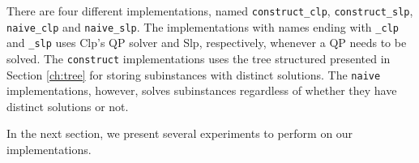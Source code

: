 There are four different implementations, named
\texttt{construct\_clp}, \texttt{construct\_slp}, \texttt{naive\_clp} and
\texttt{naive\_slp}. The implementations with names ending with
\texttt{\_clp} and \texttt{\_slp} uses Clp's QP solver and Slp, respectively,
whenever a QP needs to be solved.
The \texttt{construct} implementations uses the tree structured presented
in Section \ref{ch:tree} for storing subinstances with distinct solutions.
The \texttt{naive} implementations, however, solves subinstances regardless of
whether they have distinct solutions or not.

In the next section, we present several experiments to perform on our
implementations.
